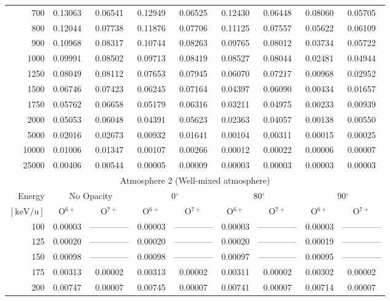 \begin{table}[ht]
\begin{tabular}{r|c|c|c|c|c|c|c|c}
      700 & 0.13063 & 0.06541 & 0.12949 & 0.06525 & 0.12430 & 0.06448 & 0.08060 & 0.05705 \\
      800 & 0.12044 & 0.07738 & 0.11876 & 0.07706 & 0.11125 & 0.07557 & 0.05622 & 0.06109 \\
      900 & 0.10968 & 0.08317 & 0.10744 & 0.08263 & 0.09765 & 0.08012 & 0.03734 & 0.05722 \\
     1000 & 0.09991 & 0.08502 & 0.09713 & 0.08419 & 0.08527 & 0.08044 & 0.02481 & 0.04944 \\
     1250 & 0.08049 & 0.08112 & 0.07653 & 0.07945 & 0.06070 & 0.07217 & 0.00968 & 0.02952 \\
     1500 & 0.06746 & 0.07423 & 0.06245 & 0.07164 & 0.04397 & 0.06090 & 0.00434 & 0.01657 \\
     1750 & 0.05762 & 0.06658 & 0.05179 & 0.06316 & 0.03211 & 0.04975 & 0.00233 & 0.00939 \\
     2000 & 0.05053 & 0.06048 & 0.04391 & 0.05623 & 0.02363 & 0.04057 & 0.00138 & 0.00550 \\
     5000 & 0.02016 & 0.02673 & 0.00932 & 0.01641 & 0.00104 & 0.00311 & 0.00015 & 0.00025 \\
    10000 & 0.01006 & 0.01347 & 0.00107 & 0.00266 & 0.00012 & 0.00022 & 0.00006 & 0.00007 \\
    25000 & 0.00406 & 0.00544 & 0.00005 & 0.00009 & 0.00003 & 0.00003 & 0.00003 & 0.00003 \\ \cline{1-9}
    \multicolumn{9}{c}{Atmosphere 2 (Well-mixed atmosphere)} \\ \cline{2-9}
    Energy & \multicolumn{2}{c|}{No Opacity} & \multicolumn{2}{c|}{0$^\circ$} & \multicolumn{2}{c|}{80$^\circ$} & \multicolumn{2}{c}{90$^\circ$} \\ \cline{2-9}
    $\mathrm{[keV/u]}$ & O$^{6+}$ & O$^{7+}$ & O$^{6+}$ & O$^{7+}$ & O$^{6+}$ & O$^{7+}$ & O$^{6+}$ & O$^{7+}$ \\ \cline{1-9}
      100 & 0.00003 & -------------- & 0.00003 & -------------- & 0.00003 & -------------- & 0.00003 & -------------- \\
      125 & 0.00020 & -------------- & 0.00020 & -------------- & 0.00020 & -------------- & 0.00019 & -------------- \\
      150 & 0.00098 & -------------- & 0.00098 & -------------- & 0.00097 & -------------- & 0.00095 & -------------- \\
      175 & 0.00313 & 0.00002 & 0.00313 & 0.00002 & 0.00311 & 0.00002 & 0.00302 & 0.00002 \\
      200 & 0.00747 & 0.00007 & 0.00745 & 0.00007 & 0.00741 & 0.00007 & 0.00714 & 0.00007 \\

\end{tabular}
\end{table}
